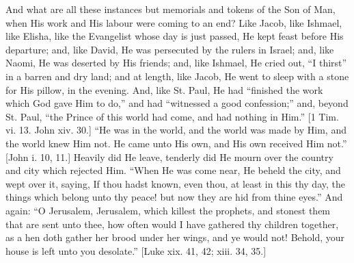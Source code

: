 And what are all these instances but memorials and tokens of the
Son of Man, when His work and His labour were coming to an end? Like
Jacob, like Ishmael, like Elisha, like the Evangelist whose day is
just passed, He kept feast before His departure; and, like David, He
was persecuted by the rulers in Israel; and, like Naomi, He was
deserted by His friends; and, like Ishmael, He cried out, ``I
thirst'' in a barren and dry land; and at length, like Jacob, He
went to sleep with a stone for His pillow, in the evening. And, like
St. Paul, He had ``finished the work which God gave Him to
do,'' and had ``witnessed a good confession;'' and, beyond
St. Paul, ``the Prince of this world had come, and had nothing in
Him.'' [1 Tim. vi. 13. John xiv. 30.] ``He was in the world,
and the world was made by Him, and the world knew Him not. He came
unto His own, and His own received Him not.'' [John i. 10, 11.]
Heavily did He leave, tenderly did He mourn over the country and city
which rejected Him. ``When He was come near, He beheld the city,
and wept over it, saying, If thou hadst known, even thou, at least in
this thy day, the things which belong unto thy peace! but now they are
hid from thine eyes.'' And again: ``O Jerusalem, Jerusalem,
which killest the prophets, and stonest them that are sent unto thee,
how often would I have gathered thy children together, as a hen doth
gather her brood under her wings, and ye would not! Behold, your house
is left unto you desolate.'' [Luke xix. 41, 42; xiii. 34, 35.]

